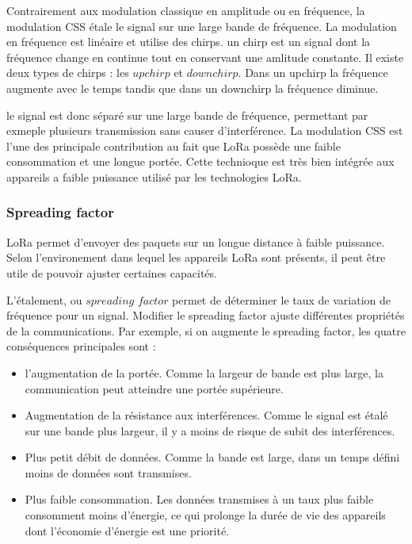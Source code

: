 Contrairement aux modulation classique en amplitude ou en fréquence, la modulation CSS étale le signal sur une large bande de fréquence. La modulation en fréquence est linéaire et utilise des chirps. un chirp est un signal dont la fréquence change en continue tout en conservant une amlitude constante. Il existe deux types de chirps : les $upchirp$ et $downchirp$.
Dans un upchirp la fréquence augmente avec le temps tandis que dans un downchirp la fréquence diminue.

\vspace{0.1cm}

le signal est donc séparé sur une large bande de fréquence, permettant par exmeple plusieurs transmission sans causer d'interférence.
La modulation CSS est l'une des principale contribution au fait que LoRa possède une faible consommation et une longue portée. Cette technioque est très bien intégrée aux appareils a faible puissance utilisé par les technologies LoRa.

\subsubsection{Spreading factor}

LoRa permet d'envoyer des paquets sur un longue distance à faible puissance. Selon l'environement dans lequel les appareils LoRa sont présents, il peut être utile de pouvoir ajuster certaines capacités.

\vspace{0.1cm}

L'étalement, ou $spreading$ $factor$ permet de déterminer le taux de variation de fréquence pour un signal. Modifier le spreading factor ajuste différentes propriétés de la communications. Par exemple, si on augmente le spreading factor, les quatre conséquences principales sont :

\vspace{0.1cm}

\begin{itemize}
\item l'augmentation de la portée. Comme la largeur de bande est plus large, la communication peut atteindre une portée supérieure.
\item Augmentation de la résistance aux interférences. Comme le signal est étalé sur une bande plus largeur, il y a moins de risque de subit des interférences.
\item Plus petit débit de données. Comme la bande est large, dans un temps défini moins de données sont transmises.
\item Plus faible consommation. Les données transmises à un taux plus faible consomment moins d'énergie, ce qui prolonge la durée de vie des appareils dont l'économie d'énergie est une priorité.
\end{itemize}

